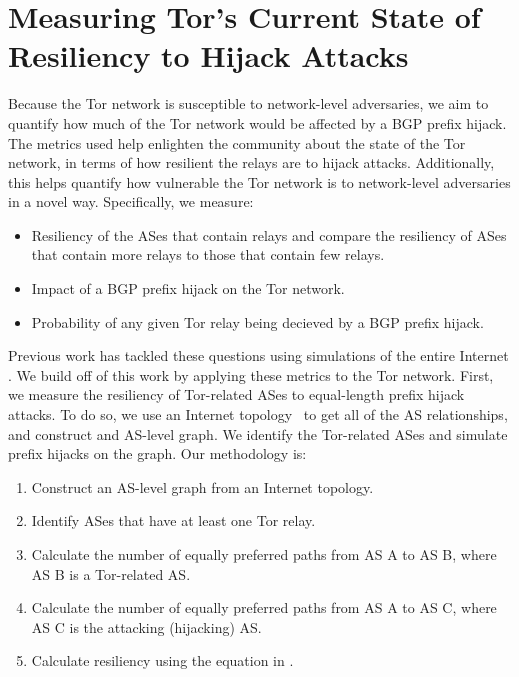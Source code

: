 \section{Measuring Tor's Current State of \\Resiliency to Hijack Attacks}

Because the Tor network is susceptible to network-level adversaries, we aim to quantify how much of the Tor network would be affected by a BGP prefix hijack.  The metrics used help enlighten the community about the state of the Tor network, in terms of how resilient the relays are to hijack attacks.  Additionally, this helps quantify how vulnerable the Tor network is to network-level adversaries in a novel way.  Specifically, we measure:

\begin{itemize}
\item Resiliency of the ASes that contain relays and compare the resiliency of ASes that contain more relays to those that contain few relays.
\item Impact of a BGP prefix hijack on the Tor network.
\item Probability of any given Tor relay being decieved by a BGP prefix hijack.
\end{itemize}

Previous work has tackled these questions using simulations of the entire Internet \cite{lad2007understanding}.  We build off of this work by applying these metrics to the Tor network.  First, we measure the resiliency of Tor-related ASes to equal-length prefix hijack attacks.  To do so, we use an Internet topology~\cite{caida} to get all of the AS relationships, and construct and AS-level graph.  We identify the Tor-related ASes and simulate prefix hijacks on the graph. Our methodology is:

\begin{enumerate}
\item Construct an AS-level graph from an Internet topology.
\item Identify ASes that have at least one Tor relay.
\item Calculate the number of equally preferred paths from AS A to AS B, where AS B is a Tor-related AS.
\item Calculate the number of equally preferred paths from AS A to AS C, where AS C is the attacking (hijacking) AS.
\item Calculate resiliency using the equation in \cite{lad2007understanding}.
\end{enumerate}

